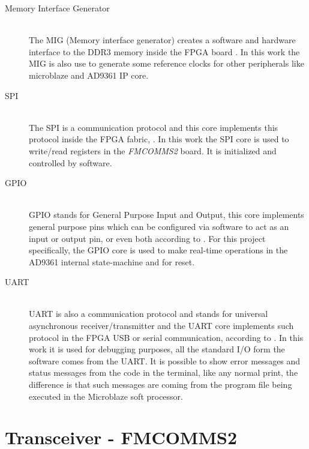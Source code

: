 \begin{description}
  \item[Memory Interface Generator] \hfill \\

  The MIG (Memory interface generator) creates a software and hardware interface
  to the DDR3 memory inside the FPGA board \cite{xilinx:mig7}. In this work the
  MIG is also use to generate some reference clocks for other peripherals like
  microblaze and AD9361 IP core.

  \item[SPI] \hfill \\

  The SPI is a communication protocol and this core implements this protocol
  inside the FPGA fabric, \cite{xilinx:axiquadspi}. In this work the SPI core
  is used to write/read registers in the \emph{FMCOMMS2} board. It is
  initialized and controlled by software.

  \item[GPIO] \hfill \\

  GPIO stands for General Purpose Input and Output, this core implements general
  purpose pins which can be configured via software to act as an input or output
  pin, or even both according to \cite{xilinx:axigpio}. For this project
  specifically, the GPIO core is used to make real-time operations in the AD9361
  internal state-machine and for reset.

  \item[UART] \hfill \\

  UART is also a communication protocol and stands for universal asynchronous
  receiver/transmitter and the UART core implements such protocol in the FPGA
  USB or serial communication, according to \cite{xilinx:axiuart}. In this work
  it is used for debugging purposes, all the standard I/O form the software
  comes from the UART. It is possible to show error messages and status
  messages from the code in the terminal, like any normal print, the difference
  is that such messages are coming from the program file being executed in the
  Microblaze soft processor.

\end{description}


\section{Transceiver - FMCOMMS2}

